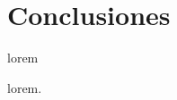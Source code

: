 \section{Conclusiones}

\begin{frame}{lorem}
    \begin{block}{lorem.}

    \end{block}


\end{frame}
